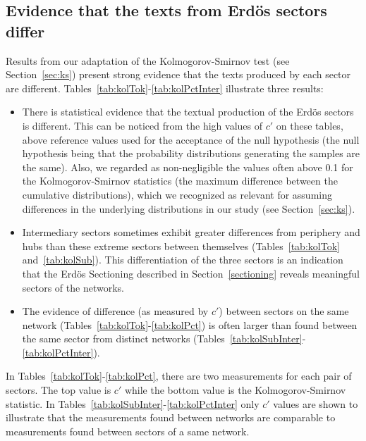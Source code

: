 \subsection{Evidence that the texts from Erd\"os sectors differ}\label{subsec:di}
Results from our adaptation of the Kolmogorov-Smirnov test (see Section~\ref{sec:ks})
present strong evidence
that the texts produced by each sector are different.
Tables~\ref{tab:kolTok}-\ref{tab:kolPctInter}
illustrate three results:
\begin{itemize}
 \item There is statistical evidence that the textual production of the Erd\"os sectors is different.
	 This can be noticed from the high values of $c'$ on these tables, above reference values used for the acceptance of the null hypothesis (the null hypothesis being that the probability distributions generating the samples are the same). Also, we regarded as non-negligible the values often above 0.1 for the Kolmogorov-Smirnov statistics (the maximum difference between the cumulative distributions), which we recognized as relevant for assuming differences in the underlying distributions in our study (see Section~\ref{sec:ks}).
  \item Intermediary sectors sometimes exhibit greater differences 
from periphery and hubs than these extreme sectors between themselves 
(Tables~\ref{tab:kolTok} and~\ref{tab:kolSub}).
This differentiation of the three sectors is an indication that the Erd\"os Sectioning described in Section~\ref{sectioning} reveals meaningful sectors of the networks.
 \item The evidence of difference (as measured by $c'$) between sectors on the same network (Tables~\ref{tab:kolTok}-\ref{tab:kolPct}) is often larger than found between the same sector from distinct networks (Tables~\ref{tab:kolSubInter}-\ref{tab:kolPctInter}).
 \end{itemize}

 In Tables~\ref{tab:kolTok}-\ref{tab:kolPct}, there are two measurements for each pair of sectors.
 The top value is $c'$ while the bottom value is the Kolmogorov-Smirnov statistic.
 In Tables~\ref{tab:kolSubInter}-\ref{tab:kolPctInter} only $c'$ values are shown to illustrate
 that the measurements found between networks are comparable to measurements found between sectors of a same network.
 
 
 

 
 
 
 


